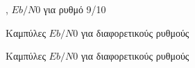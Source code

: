 \begin{figure}[h]
\caption{, $Eb/N0$ για ρυθμό 9/10}
\end{figure}

\begin{figure}[h]
\caption{Καμπύλες  $Eb/N0$ για διαφορετικούς ρυθμούς}
\end{figure}

\begin{figure}[h]
\caption{Καμπύλες  $Eb/N0$ για διαφορετικούς ρυθμούς}
\end{figure}